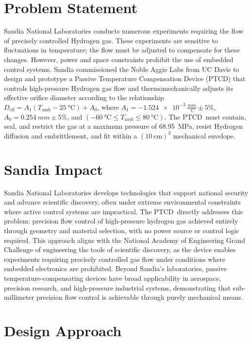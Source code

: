 \documentclass[12pt, letterpaper]{report}%
\newcounter{mycounter}           %
\newcounter{sub}[mycounter]      %
\newcommand{\device}{PTCD}
\newcommand{\degC}{^{\circ}\text{C}}    %
\newcommand{\specPressure}{\SI{68.95}{\mega \pascal}}%
\newcommand{\AoneExact}{\SI{-1.524e-3}{\frac{mm}{\degC}}}
\newcommand{\Aone}{\AoneExact \pm 5\%}
\newcommand{\AzeroExact}{\SI{0.254}{mm}}
\newcommand{\Azero}{\AzeroExact \pm 5\%}
\begin{document}
\newpage  %
\section*{Problem Statement}

	Sandia National Laboratories conducts numerous experiments requiring the flow of precisely controlled Hydrogen gas.
	These experiments are sensitive to fluctuations in temperature; the flow must be adjusted to compensate for these changes.
	However, power and space constraints prohibit the use of embedded control systems.
	Sandia commissioned the Noble Aggie Labs from UC Davis to design and prototype a Passive Temperature Compensation Device (\device)
	that controls high-pressure Hydrogen gas flow and thermomechanically adjusts its effective orifice diameter according to the relationship
    $D_{\text{eff}} = A_1 (T_{\text{amb}} - \SI{25}{\celsius}) + A_0$,
    where $A_1 = \Aone$, $A_0 = \Azero$, and $(\SI{-60}{\celsius} \leq T_{amb} \leq \SI{80}{\celsius})$\cite{ref_sandiaprompt}.
    The \device\ must contain, seal, and restrict the gas at a maximum pressure of \specPressure, resist Hydrogen diffusion and embrittlement, and fit within a $(\SI{10}{\centi\meter})^3$ mechanical envelope.
    
\section*{Sandia Impact}

Sandia National Laboratories develops technologies that support national security and advance scientific discovery, often under extreme environmental constraints 
where active control systems are impractical. The \device\ directly addresses this problem: precision flow control of high-pressure hydrogen gas achieved entirely through 
geometry and material selection, with no power source or control logic required. This approach aligns with the National Academy of Engineering Grand Challenge of engineering the tools of scientific 
discovery, as the device enables experiments requiring precisely controlled gas flow under conditions where embedded electronics are prohibited. Beyond Sandia's laboratories, 
passive temperature-compensating devices have broad applicability in aerospace, precision research, and high-pressure industrial systems, demonstrating that sub-millimeter precision 
flow control is achievable through purely mechanical means.

    \section*{Design Approach}
\end{document}
